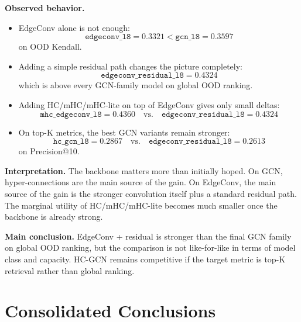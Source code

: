\documentclass[11pt,a4paper]{article}
\begin{document}
\textbf{Observed behavior.}
\begin{itemize}[noitemsep]
  \item EdgeConv alone is not enough:
  \[
  \texttt{edgeconv\_l8} = 0.3321 < \texttt{gcn\_l8} = 0.3597
  \]
  on OOD Kendall.
  \item Adding a simple residual path changes the picture completely:
  \[
  \texttt{edgeconv\_residual\_l8} = 0.4324
  \]
  which is above every GCN-family model on global OOD ranking.
  \item Adding HC/mHC/mHC-lite on top of EdgeConv gives only small deltas:
  \[
  \texttt{mhc\_edgeconv\_l8} = 0.4360
  \quad \text{vs.} \quad
  \texttt{edgeconv\_residual\_l8} = 0.4324
  \]
  \item On top-K metrics, the best GCN variants remain stronger:
  \[
  \texttt{hc\_gcn\_l8} = 0.2867
  \quad \text{vs.} \quad
  \texttt{edgeconv\_residual\_l8} = 0.2613
  \]
  on Precision@10.
\end{itemize}

\textbf{Interpretation.}
The backbone matters more than initially hoped.
On GCN, hyper-connections are the main source of the gain.
On EdgeConv, the main source of the gain is the stronger convolution itself plus a standard residual path.
The marginal utility of HC/mHC/mHC-lite becomes much smaller once the backbone is already strong.

\textbf{Main conclusion.}
EdgeConv + residual is stronger than the final GCN family on global OOD ranking,
but the comparison is not like-for-like in terms of model class and capacity.
HC-GCN remains competitive if the target metric is top-K retrieval rather than global ranking.

\section{Consolidated Conclusions}
\end{document}
